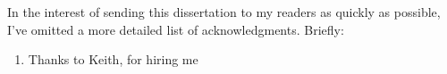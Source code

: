 In the interest of sending this dissertation to my readers as quickly as possible, I've omitted a more detailed list of acknowledgments. Briefly:
\begin{enumerate}
\item Thanks to Keith, for hiring me 
\end{enumerate}

